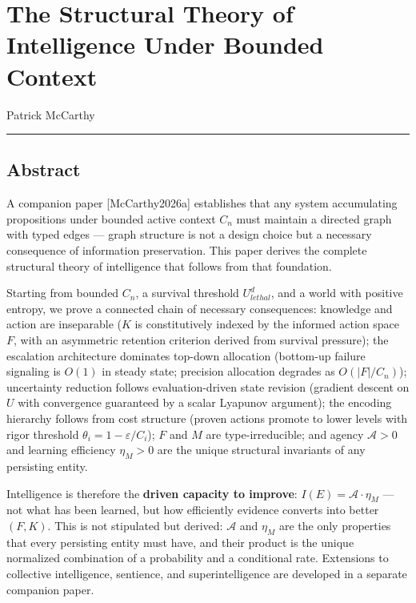 \documentclass[
]{article}
\author{}
\date{}
\begin{document}
\section{The Structural Theory of Intelligence Under Bounded
Context}\label{the-structural-theory-of-intelligence-under-bounded-context}

Patrick McCarthy

\begin{center}\rule{0.5\linewidth}{0.5pt}\end{center}

\subsection{Abstract}\label{abstract}

A companion paper {[}McCarthy2026a{]} establishes that any system
accumulating propositions under bounded active context \(C_n\) must
maintain a directed graph with typed edges --- graph structure is not a
design choice but a necessary consequence of information preservation.
This paper derives the complete structural theory of intelligence that
follows from that foundation.

Starting from bounded \(C_n\), a survival threshold \(U_{lethal}^d\),
and a world with positive entropy, we prove a connected chain of
necessary consequences: knowledge and action are inseparable (\(K\) is
constitutively indexed by the informed action space \(F\), with an
asymmetric retention criterion derived from survival pressure); the
escalation architecture dominates top-down allocation (bottom-up
failure signaling is \(O(1)\) in steady state; precision allocation
degrades as \(O(|F|/C_n)\)); uncertainty reduction follows
evaluation-driven state revision (gradient descent on \(U\) with
convergence guaranteed by a scalar Lyapunov argument); the encoding
hierarchy follows from cost structure (proven actions promote to lower
levels with rigor threshold \(\theta_i = 1 - \varepsilon/C_i\));
\(F\) and \(M\) are type-irreducible; and agency \(\mathcal{A} > 0\)
and learning efficiency \(\eta_M > 0\) are the unique structural
invariants of any persisting entity.

Intelligence is therefore the \textbf{driven capacity to improve}:
\(I(E) = \mathcal{A} \cdot \eta_M\) --- not what has been learned, but
how efficiently evidence converts into better \((F, K)\). This is not
stipulated but derived: \(\mathcal{A}\) and \(\eta_M\) are the only
properties that every persisting entity must have, and their product is
the unique normalized combination of a probability and a conditional
rate. Extensions to collective intelligence, sentience, and
superintelligence are developed in a separate companion paper.
\end{document}
